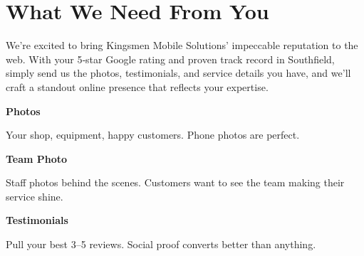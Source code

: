 \documentclass[11pt,letterpaper]{article}
\begin{document}
\vspace{0.2em}

\section*{What We Need From You}

We’re excited to bring Kingsmen Mobile Solutions’ impeccable reputation to the web. With your 5‑star Google rating and proven track record in Southfield, simply send us the photos, testimonials, and service details you have, and we’ll craft a standout online presence that reflects your expertise.

\vspace{0.12em}

\noindent\begin{minipage}[t]{0.48\textwidth}
\begin{tcolorbox}[colframe=accent-teal, boxrule=1pt, left=0.7em, right=0.7em, top=0.5em, bottom=0.5em, arc=4pt, boxsep=0pt]
{\bfseries\small\color{accent-teal}Photos}

\vspace{0.15em}

{\small Your shop, equipment, happy customers. Phone photos are perfect.}
\end{tcolorbox}

\vspace{0.1em}

\begin{tcolorbox}[colframe=accent-teal, boxrule=1pt, left=0.7em, right=0.7em, top=0.5em, bottom=0.5em, arc=4pt, boxsep=0pt]
{\bfseries\small\color{accent-teal}Team Photo}

\vspace{0.15em}

{\small Staff photos behind the scenes. Customers want to see the team making their service shine.}
\end{tcolorbox}

\vspace{0.1em}

\begin{tcolorbox}[colframe=accent-teal, boxrule=1pt, left=0.7em, right=0.7em, top=0.5em, bottom=0.5em, arc=4pt, boxsep=0pt]
{\bfseries\small\color{accent-teal}Testimonials}

\vspace{0.15em}

{\small Pull your best 3--5 reviews. Social proof converts better than anything.}
\end{tcolorbox}
\end{minipage}
\end{document}
